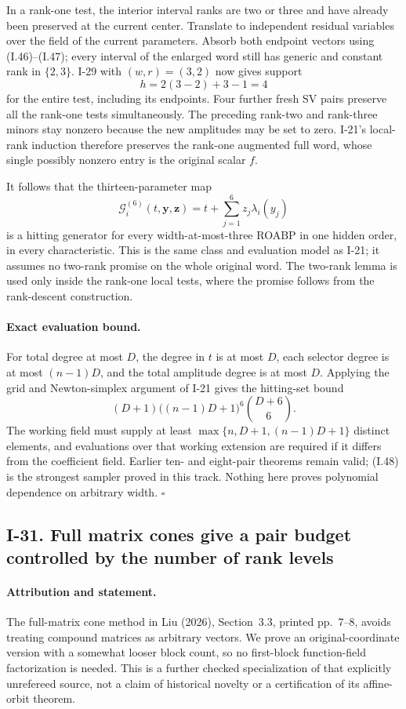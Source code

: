 In a rank-one test, the interior interval ranks are two or
three and have already been preserved at the current center.
Translate to independent residual variables over the field
of the current parameters.  Absorb both endpoint vectors
using (I.46)--(I.47); every interval of the enlarged word
still has generic and constant rank in $\{2,3\}$.
I-29 with $(w,r)=(3,2)$ now gives support
\[
 h=2(3-2)+3-1=4
\]
for the entire test, including its endpoints.  Four further
fresh SV pairs preserve all the rank-one tests simultaneously.
The preceding rank-two and rank-three minors stay nonzero
because the new amplitudes may be set to zero.
I-21's local-rank induction therefore preserves the rank-one
augmented full word, whose single possibly nonzero entry is
the original scalar $f$.

It follows that the thirteen-parameter map
\[
 \mathcal G_i^{(6)}(t,\mathbf y,\mathbf z)
      =t+\sum_{j=1}^{6}z_j\lambda_i(y_j)
 \tag{I.48}
\]
is a hitting generator for every width-at-most-three ROABP
in one hidden order, in every characteristic.  This is the
same class and evaluation model as I-21; it assumes no
two-rank promise on the whole original word.  The two-rank
lemma is used only inside the rank-one local tests, where
the promise follows from the rank-descent construction.

\paragraph{Exact evaluation bound.}
For total degree at most $D$, the degree in $t$ is at most
$D$, each selector degree is at most $(n-1)D$, and the total
amplitude degree is at most $D$.  Applying the grid and
Newton-simplex argument of I-21 gives the hitting-set bound
\[
 (D+1)\bigl((n-1)D+1\bigr)^6\binom{D+6}{6}.
 \tag{I.49}
\]
The working field must supply at least
$\max\{n,D+1,(n-1)D+1\}$ distinct elements, and evaluations
over that working extension are required if it differs
from the coefficient field.  Earlier ten- and eight-pair
theorems remain valid; (I.48) is the strongest sampler
proved in this track.  Nothing here proves polynomial
dependence on arbitrary width.
\hfill$\square$


\subsection{I-31. Full matrix cones give a pair budget controlled by the number of rank levels}
\label{I-31}

\paragraph{Attribution and statement.}
The full-matrix cone method in Liu (2026), Section~3.3,
printed pp.~7--8, avoids treating compound matrices as
arbitrary vectors.  We prove an original-coordinate version
with a somewhat looser block count, so no first-block
function-field factorization is needed.  This is a further
checked specialization of that explicitly unrefereed source,
not a claim of historical novelty or a certification of its
affine-orbit theorem.


